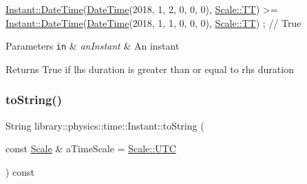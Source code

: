 \begin{DoxyCode}
\hyperlink{classlibrary_1_1physics_1_1time_1_1_instant_ac827b6ffa57ce75a3c56c462d4c872f8}{Instant::DateTime}(\hyperlink{classlibrary_1_1physics_1_1time_1_1_instant_ac827b6ffa57ce75a3c56c462d4c872f8}{DateTime}(2018, 1, 2, 0, 0, 0), 
      \hyperlink{namespacelibrary_1_1physics_1_1time_a09d2bc9fbc7b0b5f92e1419bd655e6bbadf1f3edb9115acb0a1e04209b7a9937b}{Scale::TT}) >= \hyperlink{classlibrary_1_1physics_1_1time_1_1_instant_ac827b6ffa57ce75a3c56c462d4c872f8}{Instant::DateTime}(\hyperlink{classlibrary_1_1physics_1_1time_1_1_instant_ac827b6ffa57ce75a3c56c462d4c872f8}{DateTime}(2018, 1, 1, 0, 0, 0), 
      \hyperlink{namespacelibrary_1_1physics_1_1time_a09d2bc9fbc7b0b5f92e1419bd655e6bbadf1f3edb9115acb0a1e04209b7a9937b}{Scale::TT}) ; \textcolor{comment}{// True}
\end{DoxyCode}



\begin{DoxyParams}[1]{Parameters}
\mbox{\tt in}  & {\em an\+Instant} & An instant \\
\hline
\end{DoxyParams}
\begin{DoxyReturn}{Returns}
True if lhs duration is greater than or equal to rhs duration 
\end{DoxyReturn}
\mbox{\label{classlibrary_1_1physics_1_1time_1_1_instant_aa3e7ee2c6704053afbf7ed142bb40c4e}} 
\subsubsection{\texorpdfstring{to\+String()}{toString()}}
{\footnotesize\ttfamily String library\+::physics\+::time\+::\+Instant\+::to\+String (\begin{DoxyParamCaption}\item[{const \hyperlink{namespacelibrary_1_1physics_1_1time_a09d2bc9fbc7b0b5f92e1419bd655e6bb}{Scale} \&}]{a\+Time\+Scale = {\ttfamily \hyperlink{namespacelibrary_1_1physics_1_1time_a09d2bc9fbc7b0b5f92e1419bd655e6bba9234324ddf6b4176b57d803a925b7961}{Scale\+::\+U\+TC}} }\end{DoxyParamCaption}) const}



